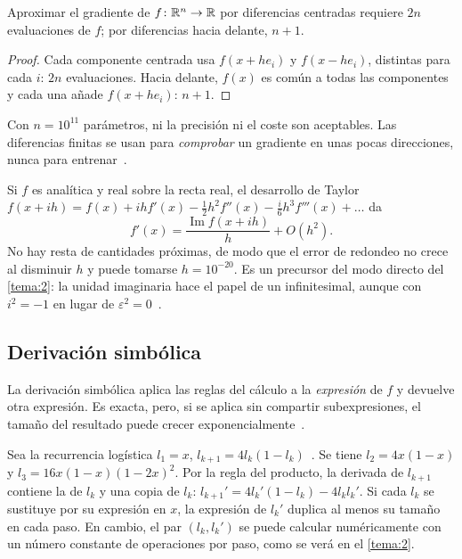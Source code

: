 \begin{proposicion}\label{prop:coste-fd}
Aproximar el gradiente de $f\colon\mathbb{R}^{n}\to\mathbb{R}$ por diferencias centradas requiere $2n$ evaluaciones de $f$; por diferencias hacia delante, $n+1$.
\end{proposicion}

\begin{proof}
Cada componente centrada usa $f(x+he_i)$ y $f(x-he_i)$, distintas para cada $i$: $2n$ evaluaciones. Hacia delante, $f(x)$ es común a todas las componentes y cada una añade $f(x+he_i)$: $n+1$.
\end{proof}

Con $n=10^{11}$ parámetros, ni la precisión ni el coste son aceptables. Las diferencias finitas se usan para \emph{comprobar} un gradiente en unas pocas direcciones, nunca para entrenar~\cite[§2.1]{baydin}.

\begin{observacion}\label{obs:paso-complejo}
Si $f$ es analítica y real sobre la recta real, el desarrollo de Taylor $f(x+ih)=f(x)+ihf'(x)-\tfrac12h^{2}f''(x)-\tfrac{i}{6}h^{3}f'''(x)+\dots$ da
\[
f'(x)=\frac{\operatorname{Im}f(x+ih)}{h}+O(h^{2}).
\]
No hay resta de cantidades próximas, de modo que el error de redondeo no crece al disminuir $h$ y puede tomarse $h=10^{-20}$. Es un precursor del modo directo del \cref{tema:2}: la unidad imaginaria hace el papel de un infinitesimal, aunque con $i^{2}=-1$ en lugar de $\varepsilon^{2}=0$~\cite{mit18337}.
\end{observacion}

\subsection{Derivación simbólica}

La derivación simbólica aplica las reglas del cálculo a la \emph{expresión} de $f$ y devuelve otra expresión. Es exacta, pero, si se aplica sin compartir subexpresiones, el tamaño del resultado puede crecer exponencialmente~\cite[§2.2]{baydin}.

\begin{ejemplo}\label{ej:logistica}
Sea la recurrencia logística $l_1=x$, $l_{k+1}=4l_k(1-l_k)$~\cite[tabla~1]{baydin}. Se tiene $l_2=4x(1-x)$ y $l_3=16x(1-x)(1-2x)^{2}$. Por la regla del producto, la derivada de $l_{k+1}$ contiene la de $l_k$ y una copia de $l_k$: $l_{k+1}'=4l_k'(1-l_k)-4l_kl_k'$. Si cada $l_k$ se sustituye por su expresión en $x$, la expresión de $l_k'$ duplica al menos su tamaño en cada paso. En cambio, el par $(l_k,l_k')$ se puede calcular numéricamente con un número constante de operaciones por paso, como se verá en el \cref{tema:2}.
\end{ejemplo}

